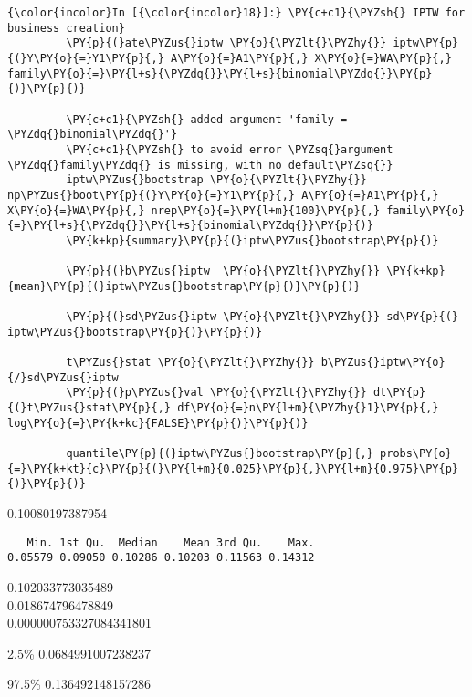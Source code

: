    \begin{Verbatim}[commandchars=\\\{\}]
{\color{incolor}In [{\color{incolor}18}]:} \PY{c+c1}{\PYZsh{} IPTW for business creation}
         \PY{p}{(}ate\PYZus{}iptw \PY{o}{\PYZlt{}\PYZhy{}} iptw\PY{p}{(}Y\PY{o}{=}Y1\PY{p}{,} A\PY{o}{=}A1\PY{p}{,} X\PY{o}{=}WA\PY{p}{,} family\PY{o}{=}\PY{l+s}{\PYZdq{}}\PY{l+s}{binomial\PYZdq{}}\PY{p}{)}\PY{p}{)}
         
         \PY{c+c1}{\PYZsh{} added argument 'family = \PYZdq{}binomial\PYZdq{}'}
         \PY{c+c1}{\PYZsh{} to avoid error \PYZsq{}argument \PYZdq{}family\PYZdq{} is missing, with no default\PYZsq{}}
         iptw\PYZus{}bootstrap \PY{o}{\PYZlt{}\PYZhy{}} np\PYZus{}boot\PY{p}{(}Y\PY{o}{=}Y1\PY{p}{,} A\PY{o}{=}A1\PY{p}{,} X\PY{o}{=}WA\PY{p}{,} nrep\PY{o}{=}\PY{l+m}{100}\PY{p}{,} family\PY{o}{=}\PY{l+s}{\PYZdq{}}\PY{l+s}{binomial\PYZdq{}}\PY{p}{)} 
         \PY{k+kp}{summary}\PY{p}{(}iptw\PYZus{}bootstrap\PY{p}{)}
         
         \PY{p}{(}b\PYZus{}iptw  \PY{o}{\PYZlt{}\PYZhy{}} \PY{k+kp}{mean}\PY{p}{(}iptw\PYZus{}bootstrap\PY{p}{)}\PY{p}{)}
         
         \PY{p}{(}sd\PYZus{}iptw \PY{o}{\PYZlt{}\PYZhy{}} sd\PY{p}{(}  iptw\PYZus{}bootstrap\PY{p}{)}\PY{p}{)}
         
         t\PYZus{}stat \PY{o}{\PYZlt{}\PYZhy{}} b\PYZus{}iptw\PY{o}{/}sd\PYZus{}iptw
         \PY{p}{(}p\PYZus{}val \PY{o}{\PYZlt{}\PYZhy{}} dt\PY{p}{(}t\PYZus{}stat\PY{p}{,} df\PY{o}{=}n\PY{l+m}{\PYZhy{}1}\PY{p}{,} log\PY{o}{=}\PY{k+kc}{FALSE}\PY{p}{)}\PY{p}{)}
         
         quantile\PY{p}{(}iptw\PYZus{}bootstrap\PY{p}{,} probs\PY{o}{=}\PY{k+kt}{c}\PY{p}{(}\PY{l+m}{0.025}\PY{p}{,}\PY{l+m}{0.975}\PY{p}{)}\PY{p}{)}
\end{Verbatim}


    0.10080197387954\\

    
    
    \begin{verbatim}
   Min. 1st Qu.  Median    Mean 3rd Qu.    Max. 
0.05579 0.09050 0.10286 0.10203 0.11563 0.14312 
    \end{verbatim}

    
    0.102033773035489\\

    
    0.018674796478849\\

    
    0.000000753327084341801\\

    
    \begin{description*}
\item[2.5\%] 0.0684991007238237\\
\item[97.5\%] 0.136492148157286
\end{description*}


